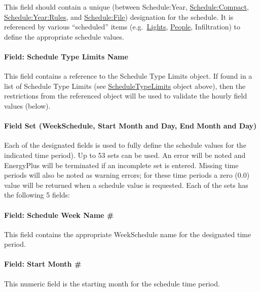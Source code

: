 This field should contain a unique (between Schedule:Year, \hyperref[schedulecompact]{Schedule:Compact}, \hyperref[scheduleyearrules]{Schedule:Year:Rules}, and \hyperref[schedulefile]{Schedule:File}) designation for the schedule. It is referenced by various ``scheduled'' items (e.g.~\hyperref[lights-000]{Lights}, \hyperref[people]{People}, Infiltration) to define the appropriate schedule values.

\paragraph{Field: Schedule Type Limits Name}\label{field-schedule-type-limits-name-3}

This field contains a reference to the Schedule Type Limits object. If found in a list of Schedule Type Limits (see \hyperref[scheduletypelimits]{ScheduleTypeLimits} object above), then the restrictions from the referenced object will be used to validate the hourly field values (below).

\paragraph{Field Set (WeekSchedule, Start Month and Day, End Month and Day)}\label{field-set-weekschedule-start-month-and-day-end-month-and-day}

Each of the designated fields is used to fully define the schedule values for the indicated time period). Up to 53 sets can be used. An error will be noted and EnergyPlus will be terminated if an incomplete set is entered. Missing time periods will also be noted as warning errors; for these time periods a zero (0.0) value will be returned when a schedule value is requested. Each of the sets has the following 5 fields:

\paragraph{Field: Schedule Week Name \#}\label{field-schedule-week-name}

This field contains the appropriate WeekSchedule name for the designated time period.

\paragraph{Field: Start Month \#}\label{field-start-month}

This numeric field is the starting month for the schedule time period.

